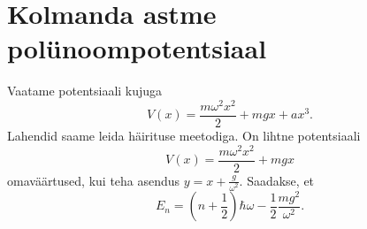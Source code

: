 \documentclass{trkut}%
\begin{document}
\section{Kolmanda astme polünoompotentsiaal}
Vaatame potentsiaali kujuga 
\begin{equation}
    V(x)=\frac{m\omega^2 x^2}{2}+mgx+ax^3. 
\end{equation}
Lahendid saame leida häirituse meetodiga. On lihtne potentsiaali  
\begin{equation}
    V(x)=\frac{m\omega^2 x^2}{2}+mgx
\end{equation}
omaväärtused, kui teha asendus \(y=x+\frac{g}{\omega^2}\). Saadakse, et
\begin{equation}
    E_n=(n+\frac{1}{2}) \hbar \omega - \frac{1}{2}\frac{mg^2}{\omega^2}.
\end{equation}


\printbibliography
\appendix
\kinnitusleht
\end{document}
